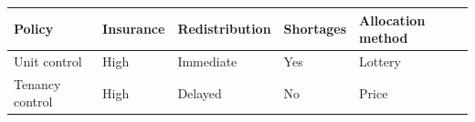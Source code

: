 \begin{table}[p]
\footnotesize
\renewcommand{\arraystretch}{1.2}
\renewcommand{\cellalign}{bc}
\begin{center}
\begin{tabular}{lllll}
\toprule
Policy & Insurance & Redistribution	& Shortages	& Allocation method \\
\midrule
Unit control & High	& Immediate	& Yes & Lottery \\
Tenancy control	& High & Delayed & No & Price \\
\bottomrule
\end{tabular}
\end{center}
\normalsize
\end{table}